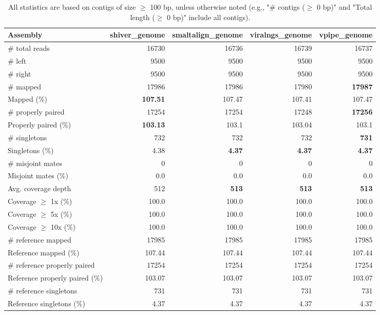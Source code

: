 \documentclass[12pt,a4paper]{article}
\begin{document}
\begin{table}[ht]
\begin{center}
\caption{All statistics are based on contigs of size $\geq$ 100 bp, unless otherwise noted (e.g., "\# contigs ($\geq$ 0 bp)" and "Total length ($\geq$ 0 bp)" include all contigs).}
\begin{tabular}{|l*{4}{|r}|}
\hline
Assembly & shiver\_genome & smaltalign\_genome & viralngs\_genome & vpipe\_genome \\ \hline
\# total reads & 16730 & 16736 & 16739 & 16737 \\ \hline
\# left & 9500 & 9500 & 9500 & 9500 \\ \hline
\# right & 9500 & 9500 & 9500 & 9500 \\ \hline
\# mapped & 17986 & 17986 & 17980 & {\bf 17987} \\ \hline
Mapped (\%) & {\bf 107.51} & 107.47 & 107.41 & 107.47 \\ \hline
\# properly paired & 17254 & 17254 & 17248 & {\bf 17256} \\ \hline
Properly paired (\%) & {\bf 103.13} & 103.1 & 103.04 & 103.1 \\ \hline
\# singletons & 732 & 732 & 732 & {\bf 731} \\ \hline
Singletons (\%) & 4.38 & {\bf 4.37} & {\bf 4.37} & {\bf 4.37} \\ \hline
\# misjoint mates & 0 & 0 & 0 & 0 \\ \hline
Misjoint mates (\%) & 0.0 & 0.0 & 0.0 & 0.0 \\ \hline
Avg. coverage depth & 512 & {\bf 513} & {\bf 513} & {\bf 513} \\ \hline
Coverage $\geq$ 1x (\%) & 100.0 & 100.0 & 100.0 & 100.0 \\ \hline
Coverage $\geq$ 5x (\%) & 100.0 & 100.0 & 100.0 & 100.0 \\ \hline
Coverage $\geq$ 10x (\%) & 100.0 & 100.0 & 100.0 & 100.0 \\ \hline
\# reference mapped & 17985 & 17985 & 17985 & 17985 \\ \hline
Reference mapped (\%) & 107.44 & 107.44 & 107.44 & 107.44 \\ \hline
\# reference properly paired & 17254 & 17254 & 17254 & 17254 \\ \hline
Reference properly paired (\%) & 103.07 & 103.07 & 103.07 & 103.07 \\ \hline
\# reference singletons & 731 & 731 & 731 & 731 \\ \hline
Reference singletons (\%) & 4.37 & 4.37 & 4.37 & 4.37 \\ \hline

\end{tabular}
\end{center}
\end{table}
\end{document}
